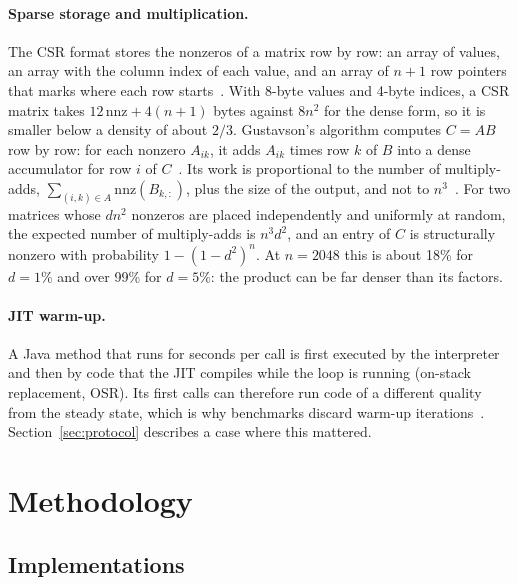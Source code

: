 \documentclass[11pt,a4paper]{article}
\begin{document}
\paragraph{Sparse storage and multiplication.} The CSR format stores the
nonzeros of a matrix row by row: an array of values, an array with the column
index of each value, and an array of $n+1$ row pointers that marks where each
row starts~\cite{saad2003}. With 8-byte values and 4-byte indices, a CSR matrix
takes $12\,\mathrm{nnz}+4(n+1)$ bytes against $8n^2$ for the dense form, so it is
smaller below a density of about $2/3$. Gustavson's algorithm computes $C=AB$ row
by row: for each nonzero $A_{ik}$, it adds $A_{ik}$ times row $k$ of $B$ into a
dense accumulator for row $i$ of $C$~\cite{gustavson1978}. Its work is
proportional to the number of multiply-adds, $\sum_{(i,k)\in A}\mathrm{nnz}(B_{k,:})$,
plus the size of the output, and not to $n^3$~\cite{gilbert1992,davis2006}.
For two matrices whose $d n^2$ nonzeros are placed independently and uniformly
at random, the expected number of multiply-adds is $n^3d^2$, and an entry of $C$
is structurally nonzero with probability $1-(1-d^2)^n$. At $n=2048$ this is
about 18\% for $d=1\%$ and over 99\% for $d=5\%$: the product can be far denser
than its factors.

\paragraph{JIT warm-up.} A Java method that runs for seconds per call is first
executed by the interpreter and then by code that the JIT compiles while the
loop is running (on-stack replacement, OSR). Its first calls can therefore run
code of a different quality from the steady state, which is why benchmarks
discard warm-up iterations~\cite{georges2007}. Section~\ref{sec:protocol}
describes a case where this mattered.

\section{Methodology}
\label{sec:method}

\subsection{Implementations}
\end{document}

